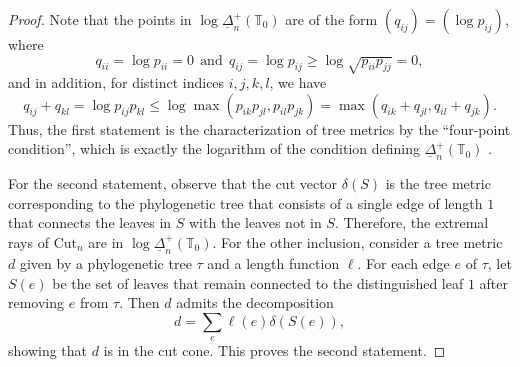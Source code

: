 \documentclass{amsart}
\theoremstyle{definition}
\theoremstyle{remark}
\def\RR{\mathbb{R}}
\def\T{\mathbb{T}}
\def\Sym{\mathrm{Sym}}
\def\Cut{\mathrm{Cut}}
\begin{document}
\begin{proof}%
Note that the points in  $\log \underline{\Delta}_n^+(\T_0)$ are of the form $(q_{ij})=(\log p_{ij})$, where 
\[
q_{ii}=\log p_{ii}=0 \ \ \text{and} \ \ q_{ij} =\log p_{ij} \ge \log \sqrt{p_{ii}p_{jj}} =0,
\]
and in addition, for distinct indices $i,j,k,l$, we have
\[
q_{ij}+q_{kl}=\log p_{ij}p_{kl} \le \log \max(p_{ik}p_{jl},p_{il}p_{jk}) = \max(q_{ik}+q_{jl}, q_{il}+q_{jk}).
\]
Thus,  the first statement is the characterization of tree metrics by the ``four-point condition'', which is exactly the logarithm of the condition defining $\underline{\Delta}^+_n(\T_0)$ \cite[Lemma 4.3.6]{Maclagan-Sturmfels}.



For the second statement, observe that the cut vector
 $\delta(S)$ is the tree metric corresponding to the phylogenetic tree that consists of a single edge of length $1$ that connects the leaves in $S$ with the leaves not in $S$. 
Therefore, the extremal rays of $\Cut_n$ are in $\log \underline{\Delta}_n^+(\T_0)$. 
For the other inclusion, consider a tree metric $d$  given by a phylogenetic tree $\tau$ and a length function $\ell$. For each edge $e$ of $\tau$, let $S(e)$ be the set of leaves that remain connected to the distinguished leaf $1$ after removing $e$ from $\tau$. Then $d$ admits the decomposition
\[
d=\sum_e \ell(e) \delta(S(e)),
\]
showing that $d$ is in the cut cone.
This proves the second statement.



\end{proof}
\end{document}
